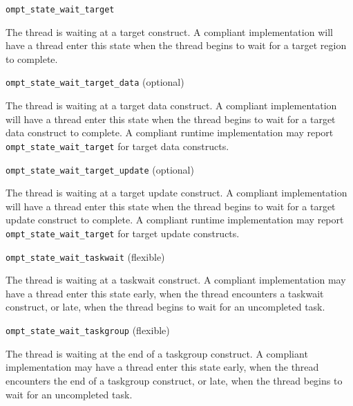 \documentclass{article}
\newcommand{\descheader}[1]{{\needspace{3\baselineskip}\vspace{1em}\noindent \fbox{#1}}}
\begin{document}
\begin{description}

\item \verb|ompt_state_wait_target| 

  The thread is waiting at a target construct. A compliant
  implementation will have a thread enter this state when the thread
  begins to wait for a target region to complete.
  
\item \verb|ompt_state_wait_target_data| (optional)

  The thread is waiting at a target data construct. A compliant
  implementation will have a thread enter this state when the thread
  begins to wait for a target data construct to complete.
  A  compliant runtime implementation may report \verb|ompt_state_wait_target| for target data constructs.

\item \verb|ompt_state_wait_target_update| (optional)

  The thread is waiting at a target update construct. A compliant
  implementation will have a thread enter this state when the thread
  begins to wait for a target update construct to complete.
  A  compliant runtime implementation may report \verb|ompt_state_wait_target| for target update constructs.


\end{description}
  
\descheader{Task Wait States}

\begin{description}

\item \verb|ompt_state_wait_taskwait| (flexible)

  The thread is waiting at a taskwait construct. A compliant
  implementation may have a thread enter this state early, when the
  thread encounters a taskwait construct, or late, when the thread
  begins to wait for an uncompleted task.

\item \verb|ompt_state_wait_taskgroup| (flexible)

  The thread is waiting at the end of a taskgroup construct. A compliant
  implementation may have a thread enter this state early, when the
  thread encounters the end of a taskgroup construct, or late, when the thread
  begins to wait for an uncompleted task.

\end{description}
\end{document}
